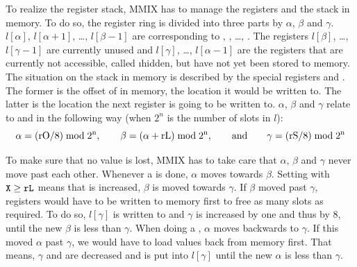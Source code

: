 To realize the register stack, MMIX has to manage the registers and the stack in memory. To do so, the register ring is divided into three parts by $\alpha$, $\beta$ and $\gamma$. $l[\alpha]$, $l[\alpha+1]$, \dots, $l[\beta-1]$ are corresponding to , , \dots, . The registers $l[\beta]$, \dots, $l[\gamma-1]$ are currently unused and $l[\gamma]$, \dots, $l[\alpha-1]$ are the registers that are currently not accessible, called \i{hidden}, but have not yet been stored to memory. The situation on the stack in memory is described by the special registers  and . The former is the offset of  in memory, \ie the location it would be written to. The latter is the location the next register is going to be written to. $\alpha$, $\beta$ and $\gamma$ relate to  and  in the following way (when $2^n$ is the number of slots in $l$):
$$\rm\alpha=(rO/8)\bmod2^n,\qquad \beta=(\alpha+rL)\bmod2^n,\qquad
\hbox{and}\qquad \gamma=(rS/8)\bmod2^n$$

To make sure that no value is lost, MMIX has to take care that $\alpha$, $\beta$ and $\gamma$ never move past each other. Whenever a  is done, $\alpha$ moves towards $\beta$. Setting  with ${\tt X} \ge {\tt rL}$ means that  is increased, \ie $\beta$ is moved towards $\gamma$. If $\beta$ moved past $\gamma$, registers would have to be written to memory first to free as many slots as required. To do so, $l[\gamma]$ is written to  and $\gamma$ is increased by one and thus  by 8, until the new $\beta$ is less than $\gamma$. When doing a , $\alpha$ moves backwards to $\gamma$. If this moved $\alpha$ past $\gamma$, we would have to load values back from memory first. That means, $\gamma$ and  are decreased and  is put into $l[\gamma]$ until the new $\alpha$ is less than $\gamma$. \citep[pg. 33]{mmix-doc}

